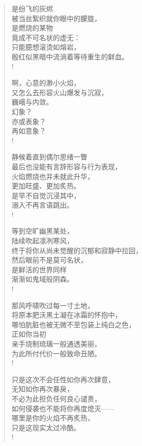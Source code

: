 \documentclass[UTF8, 12pt, a4paper]{ctexrep} %
\begin{document}
\begin{verse}
    是纷飞的灰烬\\
    被当丝絮织就你眼中的朦胧，\\
    是燃烧的某物\\
    竟成不可名状的虚无：\\
    只能臆想滚烫如熔岩，\\
    殷红似黑暗中流淌着等待重生的鲜血。\\!

    啊，心意的渺小火焰，\\
    又怎么去形容火山爆发与沉寂，\\
    巍峨与内敛。\\
    幻象？\\
    亦或表象？\\
    再如意象？\\!

    静候着直到偶尔思绪一瞥\\
    最后也没能有言辞形容与行为表现，\\
    火焰燃烧也并未就此升华，\\
    更加旺盛、更加炙热。\\
    是早不自觉沉浸其中，\\
    溺入不再言语跳出。\\!

    等到空旷幽黑某处，\\
    陆续吹起凛冽寒风，\\
    终于将你从尚未觉醒的沉郁和寂静中拉回，\\
    然后眼前不是莫可名状，\\
    是鲜活的世界同样\\
    渐渐如鬼域般阴森。\\!

    那风呼啸吹过每一寸土地，\\
    将原本肥沃黑土凝在冰霜的怀抱中，\\
    哪怕肮脏也被无微不至包装上纯白之色，\\
    正如你当初\\
    亲手烧制琉璃一般通透美丽，\\
    为此所付代价一般致命丑陋。\\!

    只是这次不会任性如你再次肆意，\\
    无知如你再次暴戾，\\
    不必为此担负任何良心谴责，\\
    如何侵袭也不能将你再度熄灭——\\
    哪里是你的火焰不再炙热，\\
    只是这现实太过冷酷。\\!


\end{verse}
\end{document}
